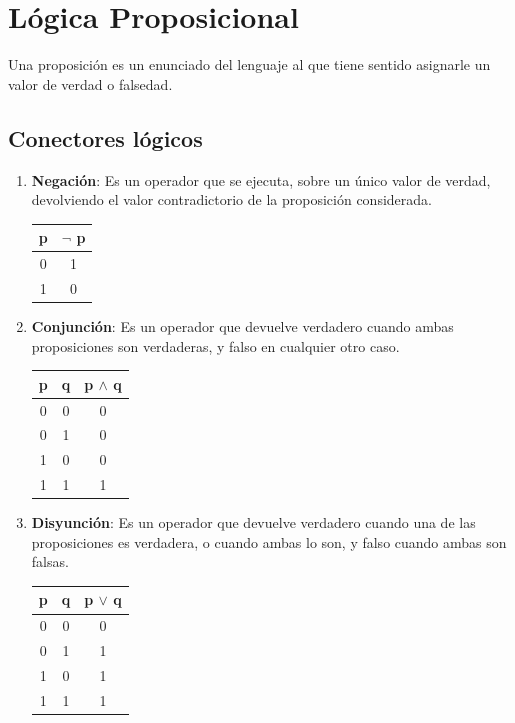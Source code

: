 
\section{Lógica Proposicional}
Una proposición es un enunciado del lenguaje al que tiene sentido asignarle un 
valor de verdad o falsedad.


   
\subsection{Conectores lógicos}
\begin{enumerate}
	\item \textbf{Negación}: Es un operador que se ejecuta, sobre un único 
	valor de verdad, devolviendo el valor contradictorio de la proposición 
	considerada.
	\begin{center}
		\begin{tabular}{|c|c|}
			\hline
			\textbf{p} & $\lnot$ \textbf{p} \\
			\cline{0 - 1}
			\hline
			0 & 1 \\
			1 & 0 \\
			\hline
		\end{tabular}
	\end{center}
	
	\item \textbf{Conjunción}: Es un operador que devuelve verdadero cuando 
	ambas proposiciones son verdaderas, y falso en cualquier otro caso.
	\begin{center}
		\begin{tabular}{|c|c|c|}
			\hline
			\textbf{p} & \textbf{q} & \textbf{p} $\wedge$ \textbf{q}\\
			\cline{0 - 1}
			\hline
			0 & 0 & 0\\
			0 & 1 & 0\\
			1 & 0 & 0\\
			1 & 1 & 1\\
			\hline
		\end{tabular}
	\end{center}
	
	\item \textbf{Disyunción}: Es un operador que devuelve verdadero cuando 
	una de las proposiciones es verdadera, o cuando ambas lo son, y falso 
	cuando ambas son falsas.
	\begin{center}
		\begin{tabular}{|c|c|c|}
			\hline
			\textbf{p} & \textbf{q} & \textbf{p} $\lor$ \textbf{q}\\
			\cline{0 - 1}
			\hline
			0 & 0 & 0\\
			0 & 1 & 1\\
			1 & 0 & 1\\
			1 & 1 & 1\\
			\hline
		\end{tabular}
	\end{center}
	

\end{enumerate}
